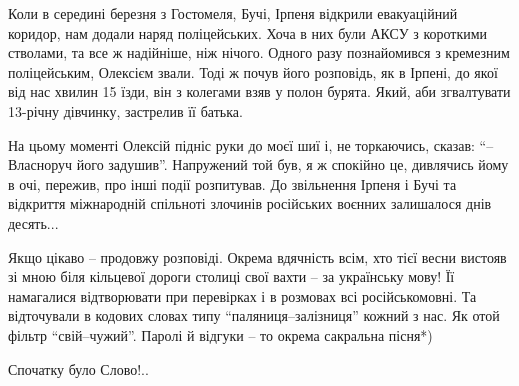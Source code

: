 Коли в середині березня з Гостомеля, Бучі, Ірпеня відкрили евакуаційний
коридор, нам додали наряд поліцейських. Хоча в них були АКСУ з короткими
стволами, та все ж надійніше, ніж нічого. Одного разу познайомився з кремезним
поліцейським, Олексієм звали. Тоді ж почув його розповідь, як в Ірпені, до якої
від нас хвилин 15 їзди, він з колегами взяв у полон бурята. Який, аби
згвалтувати 13-річну дівчинку, застрелив її батька.

На цьому моменті Олексій підніс руки до моєї шиї і, не торкаючись, сказав: \enquote{–
Власноруч його задушив}. Напружений той був, я ж спокійно це, дивлячись йому в
очі, пережив, про інші події розпитував. До звільнення Ірпеня і Бучі та
відкриття міжнародній спільноті злочинів російських воєнних залишалося днів
десять...

Якщо цікаво – продовжу розповіді. Окрема вдячність всім, хто тієї весни вистояв
зі мною біля кільцевої дороги столиці свої вахти – за українську мову! Її
намагалися відтворювати при перевірках і в розмовах всі російськомовні. Та
відточували в кодових словах типу \enquote{паляниця–залізниця} кожний з нас. Як отой
фільтр \enquote{свій–чужий}. Паролі й відгуки – то окрема сакральна пісня*)

Спочатку було Слово!..

